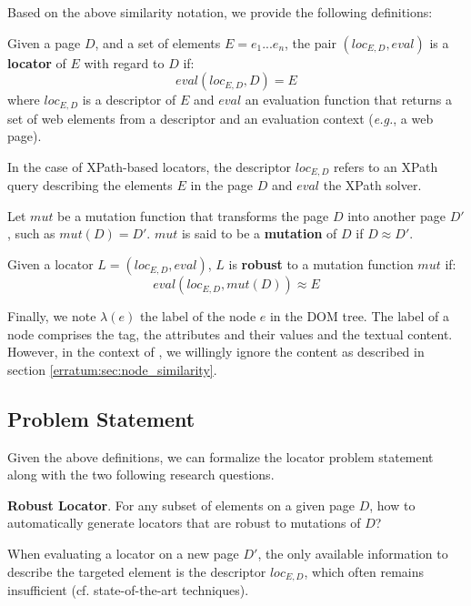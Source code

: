 
Based on the above similarity notation, we provide the following definitions:
\begin{defn}\label{loc_def}
    Given a page $D$, and a set of elements $E = {e_1...e_n}$, the pair $(loc_{E,D}, eval)$ is a \textbf{locator} of $E$ with regard to $D$ if:
    \begin{equation}
       eval(loc_{E,D}, D) = E
    \end{equation}
    where $loc_{E,D}$ is a descriptor of $E$ and $eval$ an evaluation function that returns a set of web elements from a descriptor and an evaluation context (\emph{e.g.}, a web page).
\end{defn}
In the case of XPath-based locators, the descriptor $loc_{E,D}$ refers to an XPath query describing the elements $E$ in the page $D$ and $eval$ the XPath solver.

\begin{defn}
    Let $mut$ be a mutation function that transforms the page $D$ into another page $D'$, such as $mut(D) = D'$.
    $mut$ is said to be a \textbf{mutation} of $D$ if $D \approx D'$.
\end{defn}

\begin{defn}
    Given a locator $L = (loc_{E,D}, eval)$, $L$ is \textbf{robust} to a mutation function $mut$ if:
    \begin{equation}
       eval(loc_{E, D}, mut(D)) \approx E
    \end{equation}
\end{defn}

Finally, we note $\lambda(e)$ the label of the node $e$ in the DOM tree. The label of a node comprises the tag, the attributes and their values and the textual content. However, in the context of \erratum, we willingly ignore the content as described in section \ref{erratum:sec:node_similarity}.

\subsection{Problem Statement}
Given the above definitions, we can formalize the locator problem statement along with the two following research questions.
\begin{rqn}\label{robust_locator_problem} %
    \textbf{Robust Locator}. 
    For any subset of elements on a given page $D$, how to automatically generate locators that are robust to mutations of $D$?
\end{rqn}
When evaluating a locator on a new page $D'$, the only available information to describe the targeted element is the descriptor $loc_{E,D}$, which often remains insufficient (cf. state-of-the-art techniques).

